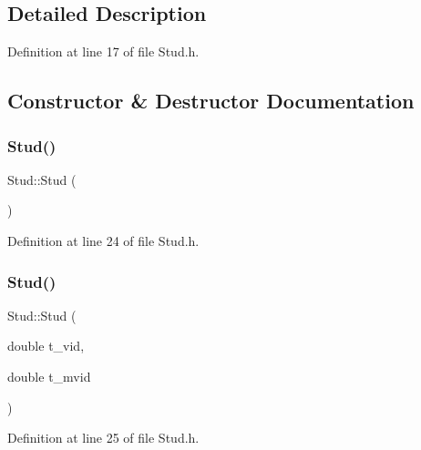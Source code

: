 \subsection{Detailed Description}


Definition at line 17 of file Stud.\+h.



\subsection{Constructor \& Destructor Documentation}
\mbox{\label{class_stud_a97585839898d45dc9fc815d5b36e2b69}} 
\subsubsection{\texorpdfstring{Stud()}{Stud()}\hspace{0.1cm}{\footnotesize\ttfamily [1/4]}}
{\footnotesize\ttfamily Stud\+::\+Stud (\begin{DoxyParamCaption}{ }\end{DoxyParamCaption})\hspace{0.3cm}{\ttfamily [inline]}}



Definition at line 24 of file Stud.\+h.

\mbox{\label{class_stud_a5122947446a7abaaba3e6538faa43db1}} 
\subsubsection{\texorpdfstring{Stud()}{Stud()}\hspace{0.1cm}{\footnotesize\ttfamily [2/4]}}
{\footnotesize\ttfamily Stud\+::\+Stud (\begin{DoxyParamCaption}\item[{double}]{t\+\_\+vid,  }\item[{double}]{t\+\_\+mvid }\end{DoxyParamCaption})\hspace{0.3cm}{\ttfamily [inline]}}



Definition at line 25 of file Stud.\+h.

\mbox{\label{class_stud_a7115844e12dadad25b9ff2de597f9eac}} 
